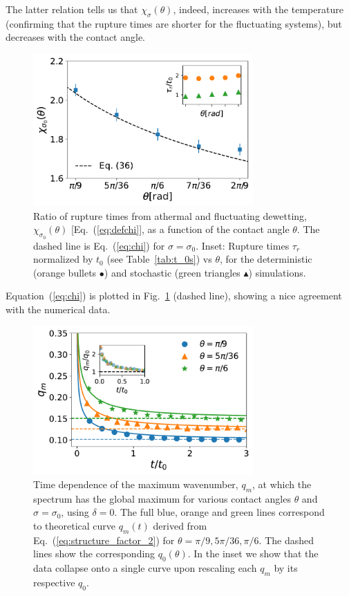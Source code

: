 The latter relation tells us that $\chi_{\sigma}(\theta)$, indeed, increases with the temperature (confirming that the rupture times are shorter for the fluctuating systems), but decreases with the contact angle.
\begin{figure}
    \centering
    \includegraphics[width=0.75\textwidth]{graphics/Andrea_model_t0_normed_rupture_times.pdf}
    \caption{Ratio of rupture times from athermal and fluctuating dewetting, $\chi_{\sigma_0}(\theta)$ [Eq.~(\ref{eq:defchi}], as a function of the contact angle $\theta$. 
    The dashed line is Eq.~(\ref{eq:chi}) for $\sigma=\sigma_0$.
    Inset: Rupture times $\tau_r$ normalized by $t_0$ (see Table~\ref{tab:t_0s}) vs $\theta$, for the deterministic (orange bullets \textcolor{pyorange}{$\bullet$}) and stochastic (green triangles \textcolor{pygreen}{$\blacktriangle$}) simulations.
    }
    \label{fig:rupture_times_semilogy_more_theta}
\end{figure}
Equation~(\ref{eq:chi}) is plotted in Fig.~\ref{fig:rupture_times_semilogy_more_theta} (dashed line), showing a nice agreement with the numerical data.
\begin{figure}
    \centering
    \includegraphics[width=0.75\textwidth]{graphics/evolution_qm_with_inset_slip0.pdf}
    \caption{Time dependence of the maximum wavenumber, $q_m$, at which the spectrum has the global maximum for various contact angles $\theta$ and $\sigma = \sigma_0$, using $\delta=0$.
    The full blue, orange and green lines correspond to theoretical curve $q_m(t)$ derived from Eq.~(\ref{eq:structure_factor_2}) for $\theta = \pi/9, 5\pi/36, \pi/6$.
    The dashed lines show the corresponding $q_0(\theta)$. 
    In the inset we show that the data collapse onto a single curve upon rescaling each $q_m$ by its respective $q_0$.}
    \label{fig:evolution_spectrum_peak_with_t}
\end{figure}

